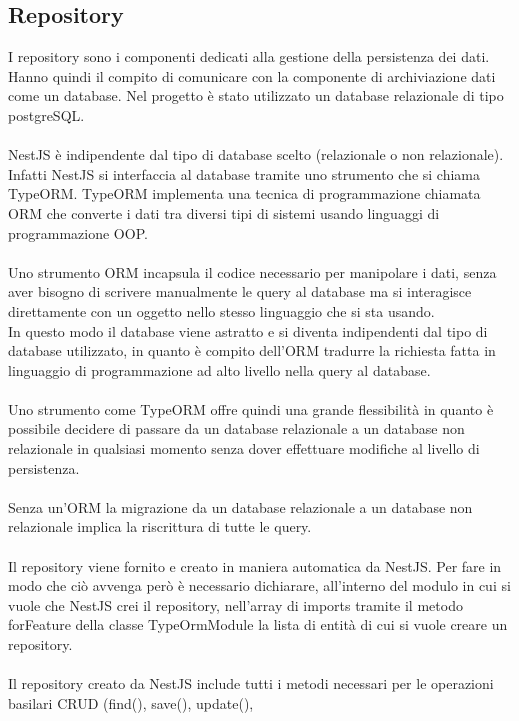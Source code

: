 \subsection{Repository}
I repository sono i componenti dedicati alla gestione della persistenza dei dati. Hanno quindi il compito di
comunicare con la componente di archiviazione dati come un database. Nel progetto è stato utilizzato un database
relazionale di tipo postgreSQL.
\\\\
NestJS è indipendente dal tipo di database scelto (relazionale o non relazionale). Infatti NestJS si interfaccia
al database tramite uno strumento che si chiama TypeORM. TypeORM implementa una tecnica di programmazione chiamata 
ORM che converte i dati tra diversi tipi di sistemi usando linguaggi di programmazione OOP.
\\\\
Uno strumento ORM incapsula il codice necessario per manipolare i dati, senza aver bisogno di scrivere manualmente
le query al database ma si interagisce direttamente con un oggetto nello stesso linguaggio che si sta usando. 
\\
In questo modo il database viene astratto e si diventa indipendenti dal tipo di database utilizzato, in quanto è compito dell'ORM
tradurre la richiesta fatta in linguaggio di programmazione ad alto livello nella query al database. 
\\\\
Uno strumento come TypeORM offre quindi una grande flessibilità in quanto è possibile decidere di passare da un database
relazionale a un database non relazionale in qualsiasi momento senza dover effettuare modifiche al livello di persistenza.
\\\\
Senza un'ORM la migrazione da un database relazionale a un database non relazionale implica la riscrittura di tutte le query.
\\\\
Il repository viene fornito e creato in maniera automatica da NestJS. Per fare in modo che ciò avvenga però è necessario
dichiarare, all'interno del modulo in cui si vuole che NestJS crei il repository, nell'array di imports tramite 
il metodo forFeature della classe TypeOrmModule la lista di entità di cui si vuole creare un repository.
\\\\
Il repository creato da NestJS include tutti i metodi necessari per le operazioni basilari CRUD (find(), save(), update(), 
